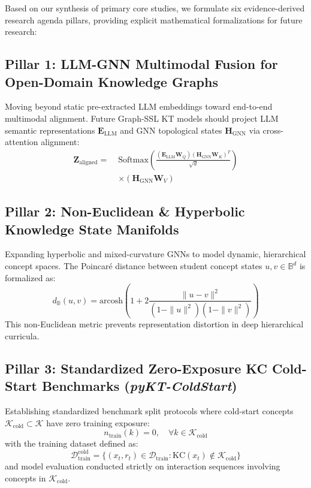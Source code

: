 \documentclass[10pt,journal,compsoc]{IEEEtran}
\begin{document}
Based on our synthesis of primary core studies, we formulate six evidence-derived research agenda pillars, providing explicit mathematical formalizations for future research:

\subsection{Pillar 1: LLM-GNN Multimodal Fusion for Open-Domain Knowledge Graphs}
Moving beyond static pre-extracted LLM embeddings toward end-to-end multimodal alignment. Future Graph-SSL KT models should project LLM semantic representations $\mathbf{E}_{\text{LLM}}$ and GNN topological states $\mathbf{H}_{\text{GNN}}$ via cross-attention alignment:
\begin{equation}
\begin{split}
\mathbf{Z}_{\text{aligned}} = \; & \text{Softmax}\left(\frac{(\mathbf{E}_{\text{LLM}}\mathbf{W}_Q)(\mathbf{H}_{\text{GNN}}\mathbf{W}_K)^T}{\sqrt{d}}\right) \\
& \times (\mathbf{H}_{\text{GNN}}\mathbf{W}_V)
\end{split}
\end{equation}

\subsection{Pillar 2: Non-Euclidean \& Hyperbolic Knowledge State Manifolds}
Expanding hyperbolic and mixed-curvature GNNs to model dynamic, hierarchical concept spaces. The Poincaré distance between student concept states $u, v \in \mathbb{B}^d$ is formalized as:
\begin{equation}
d_{\mathbb{B}}(u, v) = \text{arcosh}\left(1 + 2 \frac{\|u - v\|^2}{(1 - \|u\|^2)(1 - \|v\|^2)}\right)
\end{equation}
This non-Euclidean metric prevents representation distortion in deep hierarchical curricula.

\subsection{Pillar 3: Standardized Zero-Exposure KC Cold-Start Benchmarks (\emph{pyKT-ColdStart})}
Establishing standardized benchmark split protocols where cold-start concepts $\mathcal{K}_{\text{cold}} \subset \mathcal{K}$ have zero training exposure:
\begin{equation}
n_{\text{train}}(k) = 0, \quad \forall k \in \mathcal{K}_{\text{cold}}
\end{equation}
with the training dataset defined as:
\begin{equation}
\mathcal{D}_{\text{train}}^{\text{cold}} = \{ (x_t, r_t) \in \mathcal{D}_{\text{train}} : \text{KC}(x_t) \notin \mathcal{K}_{\text{cold}} \}
\end{equation}
and model evaluation conducted strictly on interaction sequences involving concepts in $\mathcal{K}_{\text{cold}}$.
\end{document}

